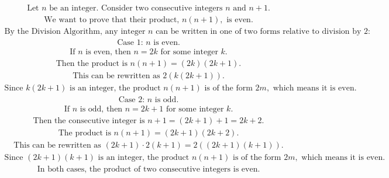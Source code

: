 \documentclass{article}
\begin{document}
\begin{align} \label{eq:1} \text{Let } n \text{ be an integer. Consider two consecutive integers } n \text{ and } n+1. \end{align}
\begin{align} \text{We want to prove that their product, } n(n+1), \text{ is even.} \end{align}
\begin{align} \text{By the Division Algorithm, any integer } n \text{ can be written in one of two forms relative to division by 2:} \end{align}
\begin{align} \text{Case 1: } n \text{ is even.} \end{align}
\begin{align} \text{If } n \text{ is even, then } n = 2k \text{ for some integer } k. \end{align}
\begin{align} \text{Then the product is } n(n+1) = (2k)(2k+1). \end{align}
\begin{align} \text{This can be rewritten as } 2(k(2k+1)). \end{align}
\begin{align} \text{Since } k(2k+1) \text{ is an integer, the product } n(n+1) \text{ is of the form } 2m, \text{ which means it is even.} \end{align}
\begin{align} \text{Case 2: } n \text{ is odd.} \end{align}
\begin{align} \text{If } n \text{ is odd, then } n = 2k+1 \text{ for some integer } k. \end{align}
\begin{align} \text{Then the consecutive integer is } n+1 = (2k+1)+1 = 2k+2. \end{align}
\begin{align} \text{The product is } n(n+1) = (2k+1)(2k+2). \end{align}
\begin{align} \text{This can be rewritten as } (2k+1) \cdot 2(k+1) = 2((2k+1)(k+1)). \end{align}
\begin{align} \text{Since } (2k+1)(k+1) \text{ is an integer, the product } n(n+1) \text{ is of the form } 2m, \text{ which means it is even.} \end{align}
\begin{align} \text{In both cases, the product of two consecutive integers is even.} \end{align}
\end{document}
